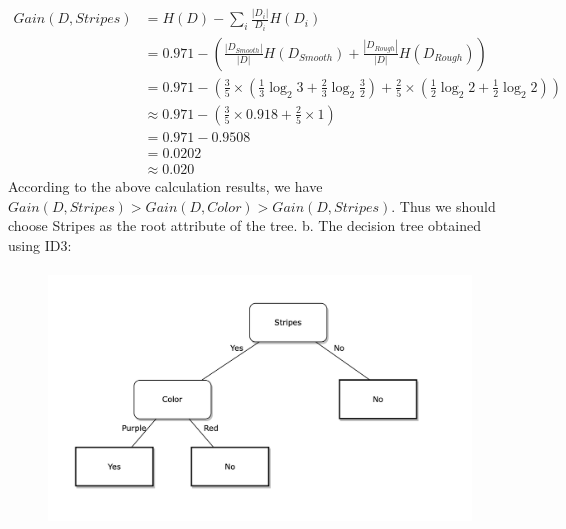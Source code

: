 \documentclass{article}
\begin{document}
    \begin{align*}
        Gain(D, Stripes) &= H(D) - \sum_{i} \frac{|D_i|}{D_i} H(D_i)\\
        &= 0.971 - (\frac{|D_{Smooth}|}{|D|} H(D_{Smooth}) + \frac{|D_{Rough}|}{|D|} H(D_{Rough}))\\
        &= 0.971 - (\frac{3}{5} \times (\frac{1}{3} \log_{2}3 + \frac{2}{3} \log_{2}\frac{3}{2}) + 
        \frac{2}{5} \times (\frac{1}{2} \log_{2}2 + \frac{1}{2} \log_{2}2))\\
        &\approx 0.971 - (\frac{3}{5} \times 0.918 + \frac{2}{5} \times 1)\\
        &= 0.971 - 0.9508\\
        &= 0.0202\\
        &\approx 0.020
    \end{align*}
    According to the above calculation results, we have $Gain(D, Stripes) > Gain(D, Color) > Gain(D, Stripes)$.
    Thus we should choose Stripes as the root attribute of the tree.
    \newpage
    b. The decision tree obtained using ID3:
    \begin{figure}[!htb]
        \begin{center}
            \includegraphics[width=11.72cm, height=6.82cm]{Q2.png}
        \end{center}
    \end{figure}
\end{document}
